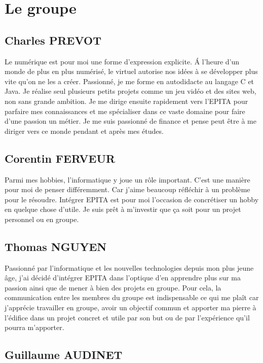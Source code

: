 \documentclass[a4paper,12pt]{article}
\begin{document}
\newpage

\section {Le groupe}

\subsection{Charles PREVOT}

Le numérique est pour moi une forme d'expression explicite. Á l'heure d'un monde de plus en plus numérisé, le virtuel autorise nos idées à se développer plus vite qu'on ne les a créer. Passionné, je me forme en autodidacte au langage C et Java. Je réalise seul plusieurs petits projets comme un jeu vidéo et des sites web, non sans grande ambition. Je me dirige ensuite rapidement vers l'EPITA pour parfaire mes connaissances et me spécialiser dans ce vaste domaine pour faire d'une passion un métier. Je me suis passionné de finance et pense peut être à me diriger vers ce monde pendant et après mes études.


\subsection{Corentin FERVEUR}

Parmi mes hobbies, l'informatique y joue un rôle important. C'est une manière pour moi de penser différemment. Car j'aime beaucoup réfléchir à un problème pour le résoudre. Intégrer EPITA est pour moi l'occasion de concrétiser un hobby en quelque chose d'utile. Je suis prêt à m'investir que ça soit pour un projet personnel ou en groupe.

\subsection{Thomas NGUYEN}

Passionné par l'informatique et les nouvelles technologies depuis mon plus jeune âge, j'ai décidé d'intégrer EPITA dans l'optique d'en apprendre plus sur ma passion ainsi que de mener à bien des projets en groupe. Pour cela, la communication entre les membres du groupe est indispensable ce qui me plaît car j'apprécie travailler en groupe, avoir un objectif commun et apporter ma pierre à l'édifice dans un projet concret et utile par son but ou de par l'expérience qu'il pourra m'apporter.

\newpage

\subsection{Guillaume AUDINET}
\end{document}
